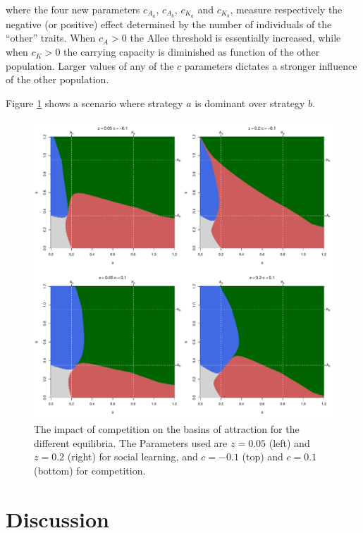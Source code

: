 \documentclass[preprint,authoryear]{elsarticle}
\begin{document}
where the four new parameters $c_{A_a}$, $c_{A_b}$, $c_{K_a}$ and $c_{K_b}$, measure respectively the negative (or positive) effect determined by the number of individuals of the “other” traits. When $c_{A}>0$ the Allee threshold is essentially increased, while when $c_{K}>0$ the carrying capacity is diminished as function of the other population. Larger values of any of the $c$ parameters dictates a stronger influence of the other population. 

Figure \ref{fig:competition} shows a scenario where strategy $a$ is dominant over strategy $b$.

\begin{figure}[h!]
  \centering
      \includegraphics[width=\textwidth]{./figures/figure7}
  \caption{The impact of competition on the basins of attraction for the different equilibria. The Parameters used are $z=0.05$ (left) and $z=0.2$ (right) for social learning, and $c=-0.1$ (top) and $c=0.1$ (bottom) for competition.}
    \label{fig:competition}
\end{figure}


\section{Discussion}
\end{document}
